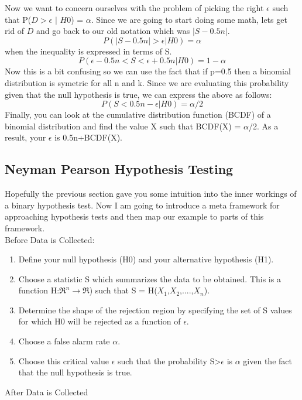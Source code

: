 \documentclass[12pt]{report}
\newcommand{\beq}{\begin{equation}} %
\newcommand{\eeq}{\end{equation}} %
\begin{document}
Now we want to concern ourselves with the problem of picking the right $\epsilon$ such that P(\(D\)$>$$\epsilon$ $|$ \(H0\)) = $\alpha$.
Since we are going to start doing some math, lets get rid of \(D\) and go back to our old notation which was \(|S-0.5n|\).
\beq
\label{eq:confidence_intervals}
P(|S-0.5n|>\epsilon | H0) = \alpha
\eeq
when the inequality is expressed in terms of S. 
\beq
\label{eq:confidence_intervals2}
P(\epsilon-0.5n < S <\epsilon+0.5n | H0) = 1-\alpha
\eeq
Now this is a bit confusing so we can use the fact that if p=0.5 then a binomial distribution is symetric for all n and k. 
Since we are evaluating this probability given that the null hypothesis is true, we can express the above as follows:
\beq
\label{eq:confidence_intervals3}
P(S < 0.5n-\epsilon | H0) = \alpha/2
\eeq
Finally, you can look at the cumulative distribution function (BCDF) of a binomial distribution and find 
the value X such that BCDF(X) = $\alpha$/2. As a result, your $\epsilon$ is 0.5n+BCDF(X).

\subsection{Neyman Pearson Hypothesis Testing}

Hopefully the previous section gave you some intuition into the inner workings of a binary 
hypothesis test. Now I am going to introduce a meta framework for approaching hypothesis 
tests and then map our example to parts of this framework.\\

Before Data is Collected:

\begin{enumerate}
\item Define your null hypothesis (H0) and your alternative hypothesis (H1).
\item Choose a statistic S which summarizes the data to be obtained. This is a function H:$\Re^n$$\rightarrow$$\Re$) such that S = H($X_1$,$X_2$,....,$X_n$).
\item Determine the shape of the rejection region by specifying the set of S values for which H0 will be rejected as a function of $\epsilon$.
\item Choose a false alarm rate $\alpha$.
\item Choose this critical value $\epsilon$ such that the probability S>$\epsilon$ is $\alpha$ given the fact that the null hypothesis is true.
\end{enumerate}

After Data is Collected
\end{document}
